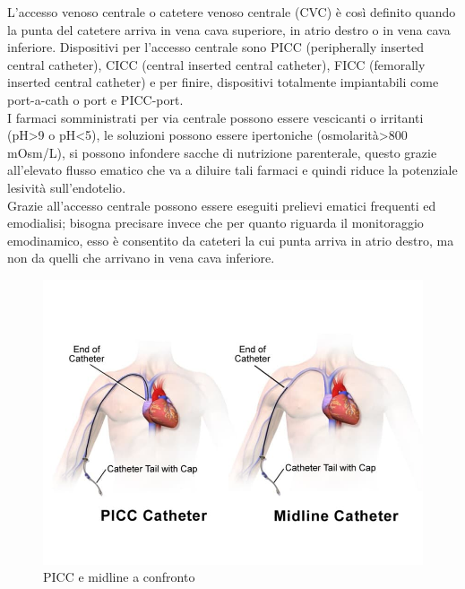 L'accesso venoso centrale o catetere venoso centrale (CVC) è così definito quando la punta del catetere arriva in 
vena cava superiore, in atrio destro o in vena cava inferiore. Dispositivi per l'accesso centrale sono PICC 
(peripherally inserted central catheter), CICC (central inserted central catheter), 
FICC (femorally inserted central catheter) e per finire, 
dispositivi totalmente impiantabili come port-a-cath o port e PICC-port\cite{GAVECELTracc2021}.\\
I farmaci somministrati per via centrale possono essere vescicanti o irritanti (pH>9 o pH<5), le soluzioni possono essere 
ipertoniche (osmolarità>800 mOsm/L), si possono infondere sacche di nutrizione parenterale\cite{LINEEGUIDA},
questo grazie all'elevato flusso ematico che va a diluire tali farmaci e quindi riduce 
la potenziale lesività sull'endotelio\cite{GAVECELTracc2021}.\\
Grazie all'accesso centrale possono essere eseguiti prelievi ematici frequenti ed emodialisi; bisogna precisare 
invece che per quanto riguarda il monitoraggio emodinamico, esso è consentito da cateteri 
la cui punta arriva in atrio destro, ma non da quelli che arrivano in vena cava inferiore\cite{GAVECELTracc2021}.

\begin{figure}[H]
    \begin{center}
    \includegraphics[width=0.5\columnwidth]{img/picc.jpeg}
    \vspace{-3mm}
    \end{center}
    \caption{PICC e midline a confronto
    \cite{img40}}
    \label{fig:FIGURE_4.3}
\end{figure}

